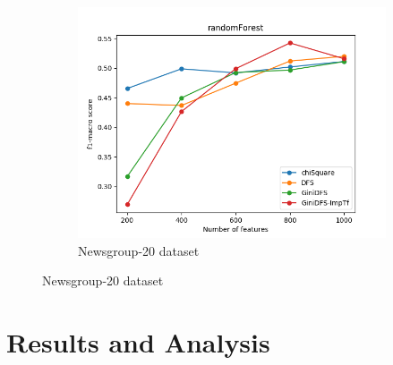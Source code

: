 \documentclass[a4paper, 14pt]{article}
\begin{document}
\begin{justify}
\begin{justify}
\begin{figure}[h!]
\centering
\begin{subfigure}{.5\textwidth}
  \centering
  \includegraphics[width=1.1\linewidth]{pf1_macro_ng_rf.png}
  \caption{Newsgroup-20 dataset}
  \label{fig:sub1}
\end{subfigure}%
\end{figure}
\newpage
\end{justify}

\begin{justify}

\end{justify}


\end{justify}


\newpage

\section{Results and Analysis}
\begin{justify}
\newpage
\newpage
\end{justify}

\newpage
\end{document}
